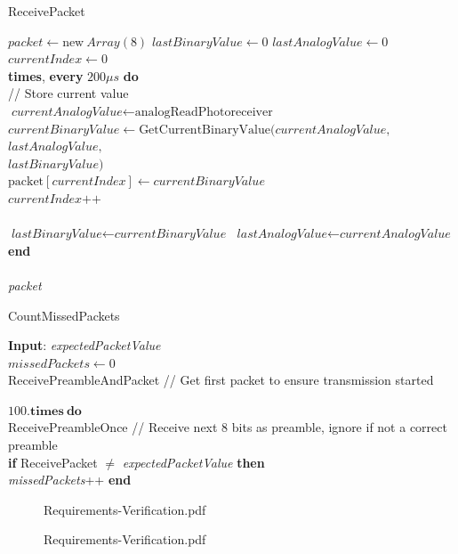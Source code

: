 \documentclass[letterpaper,10pt]{article}
\begin{document}
\begin{spacing}{1.15}
\begin{algorithm}[H]
	\caption{ReceivePacket}\label{algo-3}
	\begin{algorithmic}[1]
		\State $\textit{packet} \gets \text{new}\ \textit{Array}(8)$
		\State $\textit{lastBinaryValue} \gets 0$
		\State $\textit{lastAnalogValue} \gets 0$
		\State $currentIndex \gets 0$\\
		
		 \textbf{times}, \textbf{every} $200 \mu s$ \textbf{do}\\
		\quad // Store current value\\
		\quad $\textit{currentAnalogValue} \gets \text{analogReadPhotoreceiver}$\\
		\quad $\textit{currentBinaryValue} \gets \text{GetCurrentBinaryValue}(\textit{currentAnalogValue},$\\ 
		\hspace{7.65cm} $\textit{lastAnalogValue},$\\
		\hspace{7.65cm} $\textit{lastBinaryValue})$ \\
		\quad $\text{packet}[\textit{currentIndex}] \gets \textit{currentBinaryValue}$\\
		\quad $\textit{currentIndex}\text{++}$\\\\
		
		\State \quad $\textit{lastBinaryValue} \gets \textit{currentBinaryValue}$
		\State \quad $\textit{lastAnalogValue} \gets \textit{currentAnalogValue}$
		\State \textbf{end}\\\\
		
		\Return \textit{packet}
	\end{algorithmic}
\end{algorithm}

\begin{algorithm}[H]
	\caption{CountMissedPackets}\label{algo-4}
	\begin{algorithmic}[1]
		\State \textbf{Input}: \textit{expectedPacketValue}\\
		\State $\textit{missedPackets} \gets 0$\\
		ReceivePreambleAndPacket // Get first packet to ensure transmission started
		
		\State $100.\textbf{times}\ \textbf{do}$\\
		\quad ReceivePreambleOnce // Receive next 8 bits as preamble, ignore if not a correct preamble \\
		\quad \textbf{if} ReceivePacket $\neq$ \textit{expectedPacketValue} \textbf{then} \\
		\quad \quad \textit{missedPackets}++
		\State \textbf{end}
	\end{algorithmic}
\end{algorithm}
\clearpage

\begin{figure} [H]
	\centering
	 {Requirements-Verification.pdf}
\end{figure}
\clearpage

\begin{figure} [H]
	\centering
	 {Requirements-Verification.pdf}
\end{figure}

\end{spacing}
\end{document}

